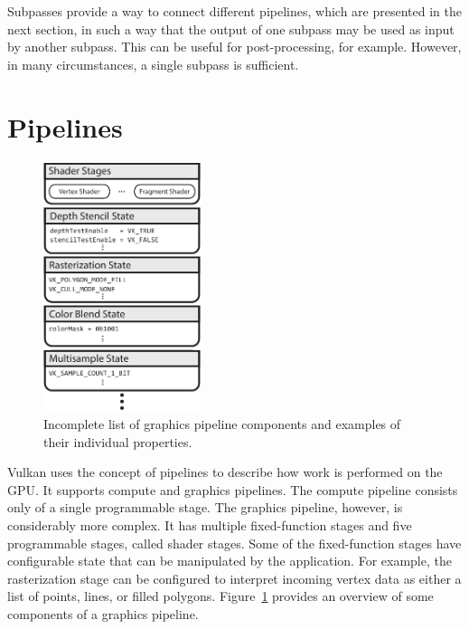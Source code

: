     Subpasses provide a way to connect different pipelines, which are presented in the next section, in such a way that the output of one subpass may be used as input by another subpass.
    This can be useful for post-processing, for example.
    However, in many circumstances, a single subpass is sufficient.

  \section{Pipelines}
  \label{sec:Pipelines}


    \begin{figure}
      \centering
      \includegraphics[width=0.41\textwidth]{Main/Images/GraphicsPipeline}
      \caption{Incomplete list of graphics pipeline components and examples of their individual properties.}
      \label{fig:GraphicsPipeline}
    \end{figure}

    Vulkan uses the concept of pipelines to describe how work is performed on the GPU.
    It supports compute and graphics pipelines.
    The compute pipeline consists only of a single programmable stage.
    The graphics pipeline, however, is considerably more complex.
    It has multiple fixed-function stages and five programmable stages, called shader stages.
    Some of the fixed-function stages have configurable state that can be manipulated by the application.
    For example, the rasterization stage can be configured to interpret incoming vertex data as either a list of points, lines, or filled polygons.
    Figure~\ref{fig:GraphicsPipeline} provides an overview of some components of a graphics pipeline.

